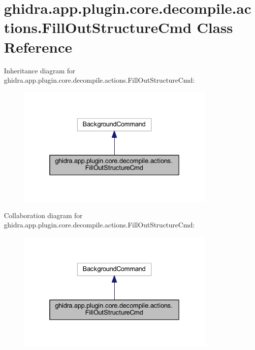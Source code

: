 \hypertarget{classghidra_1_1app_1_1plugin_1_1core_1_1decompile_1_1actions_1_1_fill_out_structure_cmd}{}\section{ghidra.\+app.\+plugin.\+core.\+decompile.\+actions.\+Fill\+Out\+Structure\+Cmd Class Reference}
\label{classghidra_1_1app_1_1plugin_1_1core_1_1decompile_1_1actions_1_1_fill_out_structure_cmd}


Inheritance diagram for ghidra.\+app.\+plugin.\+core.\+decompile.\+actions.\+Fill\+Out\+Structure\+Cmd\+:
\nopagebreak
\begin{figure}[H]
\begin{center}
\leavevmode
\includegraphics[width=277pt]{classghidra_1_1app_1_1plugin_1_1core_1_1decompile_1_1actions_1_1_fill_out_structure_cmd__inherit__graph}
\end{center}
\end{figure}


Collaboration diagram for ghidra.\+app.\+plugin.\+core.\+decompile.\+actions.\+Fill\+Out\+Structure\+Cmd\+:
\nopagebreak
\begin{figure}[H]
\begin{center}
\leavevmode
\includegraphics[width=277pt]{classghidra_1_1app_1_1plugin_1_1core_1_1decompile_1_1actions_1_1_fill_out_structure_cmd__coll__graph}
\end{center}
\end{figure}
